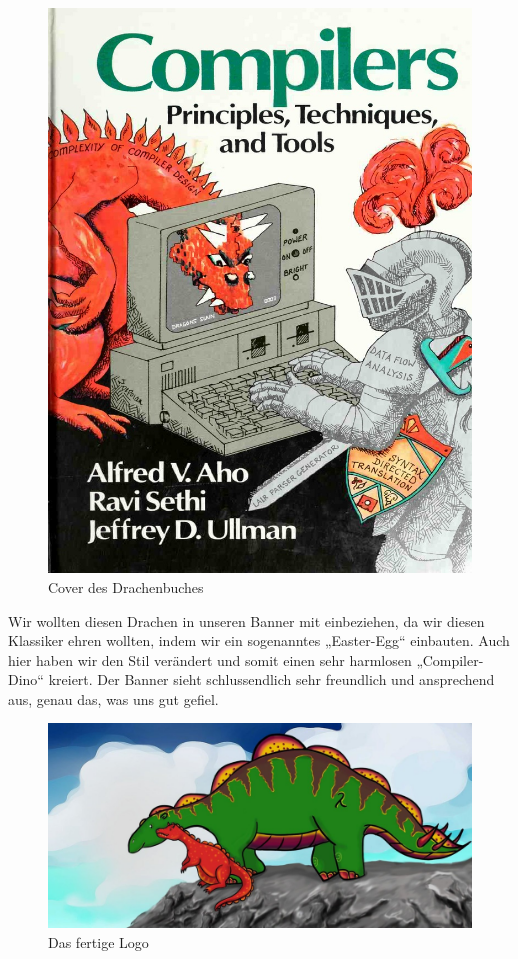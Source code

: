 \documentclass[a4paper, 12pt]{article}
\begin{document}
\begin{figure}
    \caption{Cover des Drachenbuches}
    \includegraphics[scale=0.2]{dragon-book}
\end{figure}

Wir wollten diesen Drachen in unseren Banner mit einbeziehen, da wir diesen Klassiker ehren wollten, indem wir ein sogenanntes „Easter-Egg“ einbauten. Auch hier haben wir den Stil verändert und somit einen sehr harmlosen „Compiler-Dino“ kreiert. Der Banner sieht schlussendlich sehr freundlich und ansprechend aus, genau das, was uns gut gefiel. 

\begin{figure}[h]
    \caption{Das fertige Logo}
    \centering
    \includegraphics[scale=0.3]{logo-big}
\end{figure}
\end{document}
